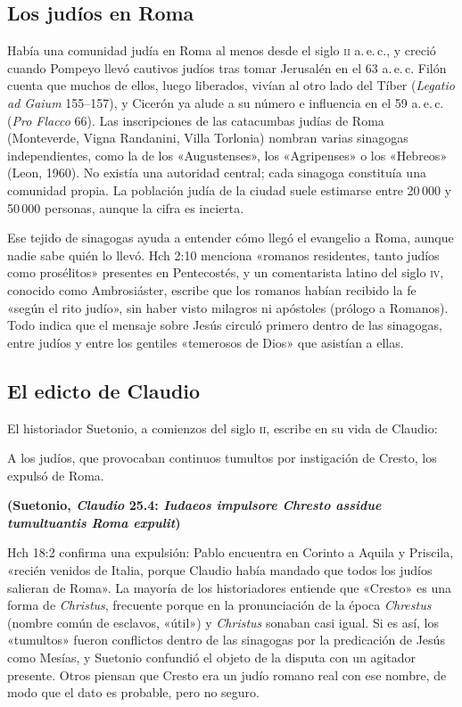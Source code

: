 \documentclass[11pt,letterpaper]{article}
\newcommand{\fuente}[1]{\par\hfill{\upshape\bfseries\small\textcolor{ladrillo}{#1}}}
\begin{document}
\subsection{Los judíos en Roma}
Había una comunidad judía en Roma al menos desde el siglo \textsc{ii} a.\,e.\,c., y creció cuando Pompeyo llevó cautivos judíos tras tomar Jerusalén en el 63 a.\,e.\,c. Filón cuenta que muchos de ellos, luego liberados, vivían al otro lado del Tíber (\emph{Legatio ad Gaium} 155--157), y Cicerón ya alude a su número e influencia en el 59 a.\,e.\,c. (\emph{Pro Flacco} 66). Las inscripciones de las catacumbas judías de Roma (Monteverde, Vigna Randanini, Villa Torlonia) nombran varias sinagogas independientes, como la de los «Augustenses», los «Agripenses» o los «Hebreos» (Leon, 1960). No existía una autoridad central; cada sinagoga constituía una comunidad propia. La población judía de la ciudad suele estimarse entre 20\,000 y 50\,000 personas, aunque la cifra es incierta.

Ese tejido de sinagogas ayuda a entender cómo llegó el evangelio a Roma, aunque nadie sabe quién lo llevó. Hch 2:10 menciona «romanos residentes, tanto judíos como prosélitos» presentes en Pentecostés, y un comentarista latino del siglo \textsc{iv}, conocido como Ambrosiáster, escribe que los romanos habían recibido la fe «según el rito judío», sin haber visto milagros ni apóstoles (prólogo a Romanos). Todo indica que el mensaje sobre Jesús circuló primero dentro de las sinagogas, entre judíos y entre los gentiles «temerosos de Dios» que asistían a ellas.

\subsection{El edicto de Claudio}
El historiador Suetonio, a comienzos del siglo \textsc{ii}, escribe en su vida de Claudio:
\begin{cita}A los judíos, que provocaban continuos tumultos por instigación de Cresto, los expulsó de Roma.\fuente{(Suetonio, \emph{Claudio} 25.4: \emph{Iudaeos impulsore Chresto assidue tumultuantis Roma expulit})}\end{cita}
Hch 18:2 confirma una expulsión: Pablo encuentra en Corinto a Aquila y Priscila, «recién venidos de Italia, porque Claudio había mandado que todos los judíos salieran de Roma». La mayoría de los historiadores entiende que «Cresto» es una forma de \emph{Christus}, frecuente porque en la pronunciación de la época \emph{Chrestus} (nombre común de esclavos, «útil») y \emph{Christus} sonaban casi igual. Si es así, los «tumultos» fueron conflictos dentro de las sinagogas por la predicación de Jesús como Mesías, y Suetonio confundió el objeto de la disputa con un agitador presente. Otros piensan que Cresto era un judío romano real con ese nombre, de modo que el dato es probable, pero no seguro.
\end{document}
